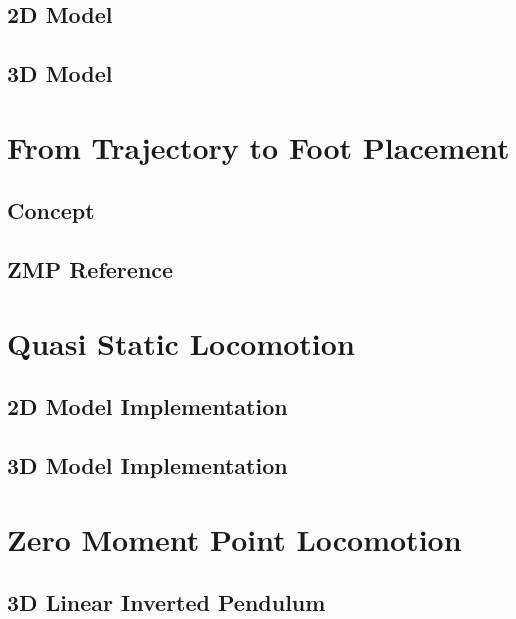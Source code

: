 \documentclass{UoNMCHA}
\begin{document}
		\subsection{2D Model}
			
		\subsection{3D Model}
			
	
	\clearpage	
	\newpage\section{From Trajectory to Foot Placement}\label{sec:NovelTraj}
		
		\subsection{Concept}
			
		\clearpage\subsection{ZMP Reference}
			
	
	\clearpage
	\newpage\section{Quasi Static Locomotion}\label{sec:Quasi Static Locomotion}
		
		\subsection{2D Model Implementation}\label{sec:2D_QS}
			
		\subsection{3D Model Implementation}\label{sec:3D_QS}
			
			
	\clearpage
	\newpage\section{Zero Moment Point Locomotion}\label{sec:Zero Moment Point Locomotion}
		
		\subsection{3D Linear Inverted Pendulum}
			
\end{document}
